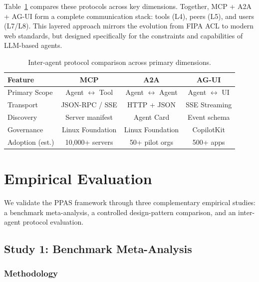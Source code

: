 \documentclass[review,authoryear]{elsarticle}
\theoremstyle{definition}
\begin{document}
Table~\ref{tab:protocols} compares these protocols across key dimensions. Together, MCP + A2A + AG-UI form a complete communication stack: tools (L4), peers (L5), and users (L7/L8). This layered approach mirrors the evolution from FIPA ACL \citep{fipa2002acl} to modern web standards, but designed specifically for the constraints and capabilities of LLM-based agents.

\begin{table}[ht]
\centering
\caption{Inter-agent protocol comparison across primary dimensions.}
\label{tab:protocols}
\begin{tabular}{lccc}
\toprule
\textbf{Feature} & \textbf{MCP} & \textbf{A2A} & \textbf{AG-UI} \\
\midrule
Primary Scope        & Agent $\leftrightarrow$ Tool & Agent $\leftrightarrow$ Agent & Agent $\leftrightarrow$ UI \\
Transport            & JSON-RPC / SSE               & HTTP + JSON                   & SSE Streaming \\
Discovery            & Server manifest              & Agent Card                    & Event schema \\
Governance           & Linux Foundation             & Linux Foundation              & CopilotKit \\
Adoption (est.)      & 10,000+ servers              & 50+ pilot orgs                & 500+ apps \\
\bottomrule
\end{tabular}
\end{table}

\section{Empirical Evaluation}\label{sec:evaluation}

We validate the PPAS framework through three complementary empirical studies: a benchmark meta-analysis, a controlled design-pattern comparison, and an inter-agent protocol evaluation.

\subsection{Study 1: Benchmark Meta-Analysis}\label{sec:benchmarks}

\subsubsection{Methodology}
\end{document}
